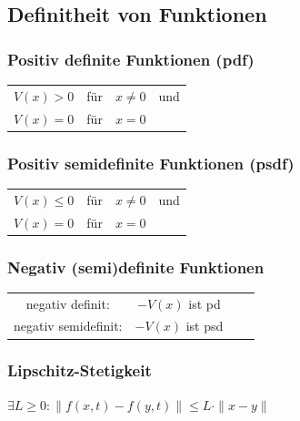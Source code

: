 \documentclass[german]{latex4ei/latex4ei_sheet}
\begin{document}
\begin{sectionbox}
\subsection{Definitheit von Funktionen}

\subsubsection{Positiv definite Funktionen (pdf)}
\begin{tabular}{cccc}
  $V(x) > 0$ & für & $x \neq 0$ & und \\
  $V(x) = 0$ & für & $x = 0$ &
\end{tabular}

\subsubsection{Positiv semidefinite Funktionen (psdf)}
\begin{tabular}{cccc}
  $V(x) \leq 0$ & für & $x \neq 0$ & und \\
  $V(x) = 0$ & für & $x = 0$ &
\end{tabular}

\subsubsection{Negativ (semi)definite Funktionen}
\begin{tabular}{cccc}
  negativ definit: & $-V(x)$ ist pd \\
  negativ semidefinit: & $-V(x)$ ist psd
\end{tabular}

\subsubsection{Lipschitz-Stetigkeit}
$\exists L \geq 0 : \| f(x,t) - f(y,t) \| \leq L \cdot \|x-y\| $
\end{sectionbox}
\end{document}
